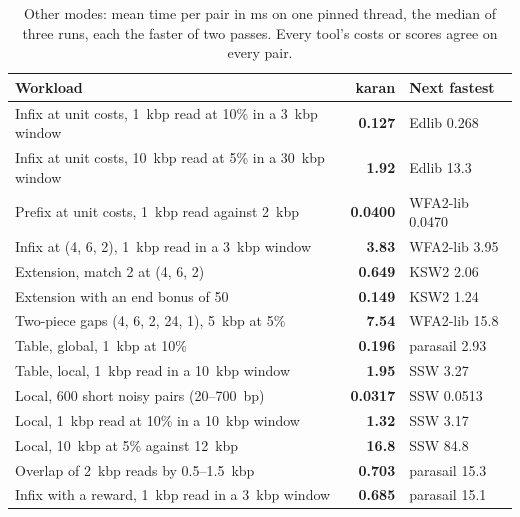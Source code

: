 \documentclass[10pt]{article}
\begin{document}
\begin{table}[t]
\caption{Other modes: mean time per pair in ms on one pinned thread, the median of three runs, each the faster of two passes. Every tool's costs or scores agree on every pair.}\label{tab:modes}
\centering\footnotesize
\setlength{\tabcolsep}{4pt}
\begin{tabular}{@{}>{\raggedright\arraybackslash}p{3.1cm}rl@{}}
\toprule
Workload & karan & Next fastest \\
\midrule
Infix at unit costs, 1~kbp read at 10\% in a 3~kbp window & \textbf{0.127} & Edlib 0.268 \\
Infix at unit costs, 10~kbp read at 5\% in a 30~kbp window & \textbf{1.92} & Edlib 13.3 \\
Prefix at unit costs, 1~kbp read against 2~kbp & \textbf{0.0400} & WFA2-lib 0.0470 \\
Infix at (4, 6, 2), 1~kbp read in a 3~kbp window & \textbf{3.83} & WFA2-lib 3.95 \\
Extension, match 2 at (4, 6, 2) & \textbf{0.649} & KSW2 2.06 \\
Extension with an end bonus of 50 & \textbf{0.149} & KSW2 1.24 \\
Two-piece gaps (4, 6, 2, 24, 1), 5~kbp at 5\% & \textbf{7.54} & WFA2-lib 15.8 \\
Table, global, 1~kbp at 10\% & \textbf{0.196} & parasail 2.93 \\
Table, local, 1~kbp read in a 10~kbp window & \textbf{1.95} & SSW 3.27 \\
Local, 600 short noisy pairs (20–700~bp) & \textbf{0.0317} & SSW 0.0513 \\
Local, 1~kbp read at 10\% in a 10~kbp window & \textbf{1.32} & SSW 3.17 \\
Local, 10~kbp at 5\% against 12~kbp & \textbf{16.8} & SSW 84.8 \\
Overlap of 2~kbp reads by 0.5–1.5~kbp & \textbf{0.703} & parasail 15.3 \\
Infix with a reward, 1~kbp read in a 3~kbp window & \textbf{0.685} & parasail 15.1 \\
\bottomrule
\end{tabular}
\end{table}
\end{document}
